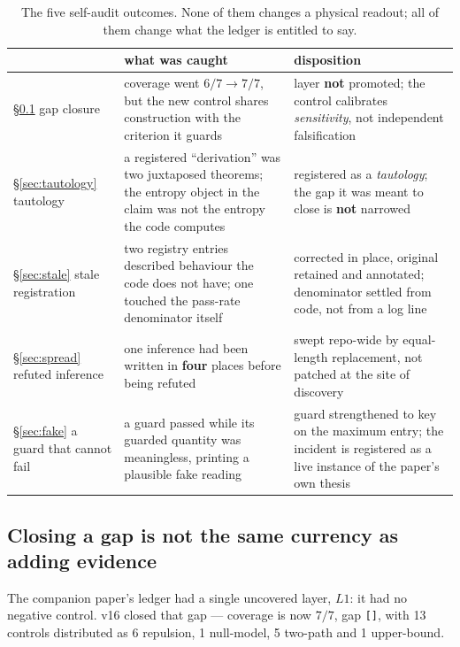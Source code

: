 \documentclass[11pt,a4paper]{article}
\newcommand{\code}[1]{\texttt{\small #1}}
\begin{document}
\begin{table}[h]
\centering
\small
\begin{tabular}{p{1.9cm} p{6.4cm} p{5.5cm}}
\toprule
 & \textbf{what was caught} & \textbf{disposition} \\
\midrule
\S\ref{sec:gapclosure} gap closure
 & coverage went $6/7 \to 7/7$, but the new control shares construction with
   the criterion it guards
 & layer \textbf{not} promoted; the control calibrates \emph{sensitivity},
   not independent falsification \\
\addlinespace
\S\ref{sec:tautology} tautology
 & a registered ``derivation'' was two juxtaposed theorems; the entropy object
   in the claim was not the entropy the code computes
 & registered as a \emph{tautology}; the gap it was meant to close is
   \textbf{not} narrowed \\
\addlinespace
\S\ref{sec:stale} stale registration
 & two registry entries described behaviour the code does not have; one touched
   the pass-rate denominator itself
 & corrected in place, original retained and annotated; denominator settled
   from code, not from a log line \\
\addlinespace
\S\ref{sec:spread} refuted inference
 & one inference had been written in \textbf{four} places before being refuted
 & swept repo-wide by equal-length replacement, not patched at the site of
   discovery \\
\addlinespace
\S\ref{sec:fake} a guard that cannot fail
 & a guard passed while its guarded quantity was meaningless, printing a
   plausible fake reading
 & guard strengthened to key on the maximum entry; the incident is registered
   as a live instance of the paper's own thesis \\
\bottomrule
\end{tabular}
\caption{The five self-audit outcomes. None of them changes a physical readout;
all of them change what the ledger is entitled to say.}
\label{tab:selfaudit}
\end{table}

\subsection{Closing a gap is not the same currency as adding evidence}
\label{sec:gapclosure}

The companion paper's ledger had a single uncovered layer, $L1$: it had no
negative control. v16 closed that gap --- coverage is now $7/7$, gap \code{[]},
with 13 controls distributed as 6 repulsion, 1 null-model, 5 two-path and 1
upper-bound.
\end{document}
